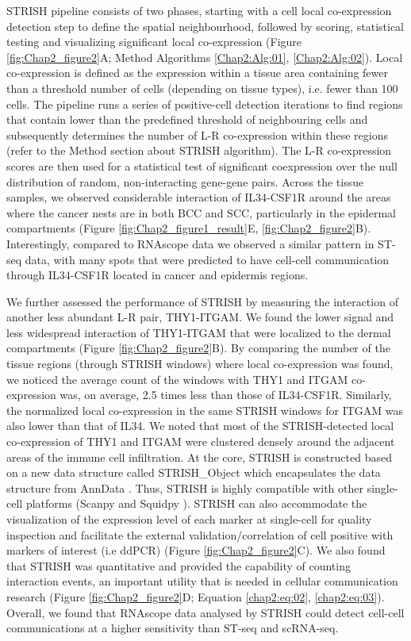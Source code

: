 STRISH pipeline consists of two phases, starting with a cell local co-expression detection step to define the spatial neighbourhood, followed by scoring, statistical testing and visualizing significant local co-expression (Figure \ref{fig:Chap2_figure2}A; Method Algorithms \ref{Chap2:Alg:01}, \ref{Chap2:Alg:02}). Local co-expression is defined as the expression within a tissue area containing fewer than a threshold number of cells (depending on tissue types), i.e. fewer than 100 cells. The pipeline runs a series of positive-cell detection iterations to find regions that contain lower than the predefined threshold of neighbouring cells and subsequently determines the number of L-R co-expression within these regions (refer to the Method section about STRISH algorithm). The L-R co-expression scores are then used for a statistical test of significant coexpression over the null distribution of random, non-interacting gene-gene pairs. Across the tissue samples, we observed considerable interaction of IL34-CSF1R around the areas where the cancer nests are in both BCC and SCC, particularly in the epidermal compartments (Figure \ref{fig:Chap2_figure1_result}E, \ref{fig:Chap2_figure2}B). Interestingly, compared to RNAscope data we observed a similar pattern in ST-seq data, with many spots that were predicted to have cell-cell communication through IL34-CSF1R located in cancer and epidermis regions.  

We further assessed the performance of STRISH by measuring the interaction of another less abundant L-R pair, THY1-ITGAM. We found the lower signal and less widespread interaction of THY1-ITGAM that were localized to the dermal compartments (Figure \ref{fig:Chap2_figure2}B). By comparing the number of the tissue regions (through STRISH windows) where local co-expression was found, we noticed the average count of the windows with THY1 and ITGAM co-expression was, on average, 2.5 times less than those of IL34-CSF1R. Similarly, the normalized local co-expression in the same STRISH windows for ITGAM was also lower than that of IL34. We noted that most of the STRISH-detected local co-expression of THY1 and ITGAM were clustered densely around the adjacent areas of the immune cell infiltration. At the core, STRISH is constructed based on a new data structure called STRISH\_Object which encapsulates the data structure from AnnData \cite{wolf2018scanpy}. Thus, STRISH is highly compatible with other single-cell platforms (\ie Scanpy \cite{wolf2018scanpy} and Squidpy \cite{palla2022squidpy}). STRISH can also accommodate the visualization of the expression level of each marker at single-cell for quality inspection and facilitate the external validation/correlation of cell positive with markers of interest (i.e ddPCR) (Figure \ref{fig:Chap2_figure2}C). We also found that STRISH was quantitative and provided the capability of counting interaction events, an important utility that is needed in cellular communication research (Figure \ref{fig:Chap2_figure2}D; Equation \ref{chap2:eq:02}, \ref{chap2:eq:03}). Overall, we found that RNAscope data analysed by STRISH could detect cell-cell communications at a higher sensitivity than ST-seq and scRNA-seq. 

